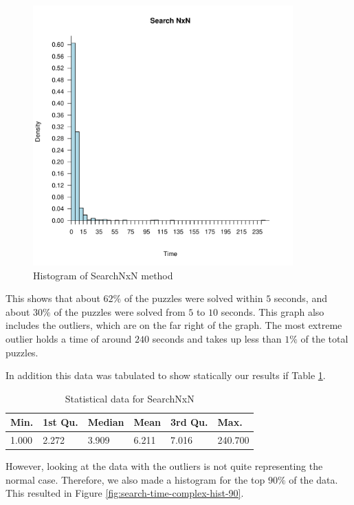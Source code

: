 \documentclass[letterpaper]{article}
\begin{document}
\begin{figure}[h]
	\centering
	\includegraphics[width=100mm]{../stats/searchNxNEasy.pdf}
	\caption{Histogram of SearchNxN method}
	\label{fig:search-time-complex-hist}
\end{figure}

This shows that about $62\%$ of the puzzles were solved within $5$ seconds, and about $30\%$ of the puzzles were solved from $5$ to $10$ seconds. This graph also includes the outliers, which are on the far right of the graph. The most extreme outlier holds a time of around $240$ seconds and takes up less than $1\%$ of the total puzzles.

In addition this data was tabulated to show statically our results if Table \ref{tab: SearchNxNTab1}.

\begin{table}[h]
\begin{tabular}{|l|l|l|l|l|l|}
\hline
Min. & 1st Qu.  & Median & Mean & 3rd Qu. & Max.\\
\hline
1.000 & 2.272 & 3.909 & 6.211 & 7.016 & 240.700\\
\hline
\end{tabular}
\caption{Statistical data for SearchNxN}
\label{tab: SearchNxNTab1}
\end{table}

However, looking at the data with the outliers is not quite representing the normal case. Therefore, we also made a histogram for the top $90\%$ of the data. This resulted in Figure \ref{fig:search-time-complex-hist-90}.
\end{document}
